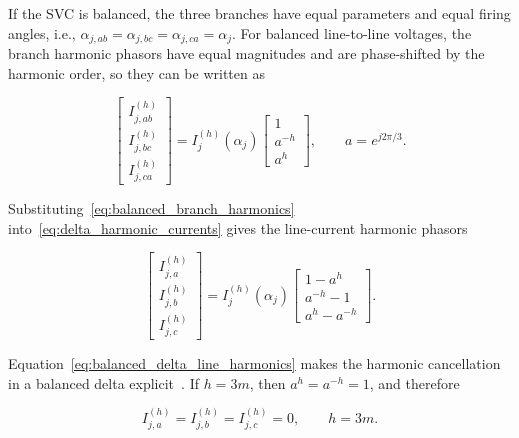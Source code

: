\documentclass[journal]{IEEEtran}
\begin{document}
If the SVC is balanced, the three branches have equal parameters and equal
firing angles, i.e.,
$\alpha_{j,ab}=\alpha_{j,bc}=\alpha_{j,ca}=\alpha_j$. For balanced
line-to-line voltages, the branch harmonic phasors have equal magnitudes and
are phase-shifted by the harmonic order, so they can be written as

\begin{equation}
    \begin{bmatrix}
    I_{j,ab}^{(h)} \\
    I_{j,bc}^{(h)} \\
    I_{j,ca}^{(h)}
    \end{bmatrix}
    = I_j^{(h)}(\alpha_j)
    \begin{bmatrix}
    1 \\
    a^{-h} \\
    a^{h}
    \end{bmatrix},
    \qquad a=e^{j2\pi/3}.
    \label{eq:balanced_branch_harmonics}
\end{equation}

\noindent Substituting~\eqref{eq:balanced_branch_harmonics}
into~\eqref{eq:delta_harmonic_currents} gives the line-current harmonic
phasors

\begin{equation}
    \begin{bmatrix}
    I_{j,a}^{(h)} \\
    I_{j,b}^{(h)} \\
    I_{j,c}^{(h)}
    \end{bmatrix}
    = I_j^{(h)}(\alpha_j)
    \begin{bmatrix}
    1-a^{h} \\
    a^{-h}-1 \\
    a^{h}-a^{-h}
    \end{bmatrix}.
    \label{eq:balanced_delta_line_harmonics}
\end{equation}

\noindent Equation~\eqref{eq:balanced_delta_line_harmonics} makes the
harmonic cancellation in a balanced delta explicit~\cite{MathurVarma2002}.
If $h=3m$, then
$a^h=a^{-h}=1$, and therefore

\begin{equation}
    I_{j,a}^{(h)}=I_{j,b}^{(h)}=I_{j,c}^{(h)}=0,
    \qquad h=3m.
    \label{eq:triplen_delta_cancellation}
\end{equation}
\end{document}
